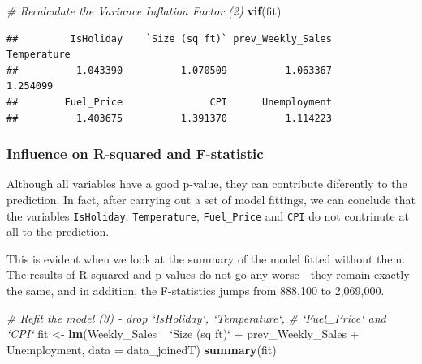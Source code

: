 \documentclass[11pt,]{article}
\newenvironment{Shaded}{\begin{snugshade}}{\end{snugshade}}
\newcommand{\KeywordTok}[1]{\textcolor[rgb]{0.13,0.29,0.53}{\textbf{{#1}}}}
\newcommand{\DataTypeTok}[1]{\textcolor[rgb]{0.13,0.29,0.53}{{#1}}}
\newcommand{\StringTok}[1]{\textcolor[rgb]{0.31,0.60,0.02}{{#1}}}
\newcommand{\CommentTok}[1]{\textcolor[rgb]{0.56,0.35,0.01}{\textit{{#1}}}}
\newcommand{\NormalTok}[1]{{#1}}
\begin{document}
\begin{Shaded}
\begin{Highlighting}[]
\CommentTok{# Recalculate the Variance Inflation Factor (2)}
\KeywordTok{vif}\NormalTok{(fit)}
\end{Highlighting}
\end{Shaded}

\begin{verbatim}
##         IsHoliday    `Size (sq ft)` prev_Weekly_Sales       Temperature 
##          1.043390          1.070509          1.063367          1.254099 
##        Fuel_Price               CPI      Unemployment 
##          1.403675          1.391370          1.114223
\end{verbatim}

\subsubsection{Influence on R-squared and
F-statistic}\label{influence-on-r-squared-and-f-statistic}

Although all variables have a good p-value, they can contribute
diferently to the prediction. In fact, after carrying out a set of model
fittings, we can conclude that the variables \texttt{IsHoliday},
\texttt{Temperature}, \texttt{Fuel\_Price} and \texttt{CPI} do not
contrinute at all to the prediction.

This is evident when we look at the summary of the model fitted without
them. The results of R-squared and p-values do not go any worse - they
remain exactly the same, and in addition, the F-statistics jumps from
888,100 to 2,069,000.

\begin{Shaded}
\begin{Highlighting}[]
\CommentTok{# Refit the model (3) - drop `IsHoliday`, `Temperature`,}
\CommentTok{# `Fuel_Price` and `CPI`}
\NormalTok{fit <-}\StringTok{ }\KeywordTok{lm}\NormalTok{(Weekly_Sales ~}\StringTok{ `}\DataTypeTok{Size (sq ft)}\StringTok{`} \NormalTok{+}\StringTok{ }\NormalTok{prev_Weekly_Sales +}\StringTok{ }
\StringTok{    }\NormalTok{Unemployment, }\DataTypeTok{data =} \NormalTok{data_joinedT)}
\KeywordTok{summary}\NormalTok{(fit)}
\end{Highlighting}
\end{Shaded}
\end{document}
